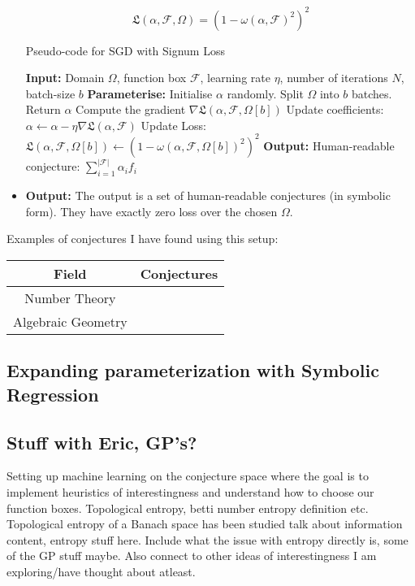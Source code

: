 \begin{itemize}
\begin{definition}
\begin{equation*}
                \mathfrak{L}(\alpha,\mathcal{F}, \Omega) = (1 - \omega(\alpha, \mathcal{F})^2)^2
            \end{equation*}
        \end{definition}
        \begin{algorithm}
        \caption{Pseudo-code for SGD with Signum Loss}\label{alg:SGD}
        \begin{algorithmic}
        \State \textbf{Input:} Domain $\Omega$, function box $\mathcal{F}$, learning rate $\eta$, number of iterations $N$, batch-size $b$
        \State \textbf{Parameterise:} Initialise $\alpha$ randomly. Split $\Omega$ into $b$ batches.
                    \State Return $\alpha$
                \EndIf
                \State Compute the gradient $\nabla\mathfrak{L}(\alpha, \mathcal{F}, \Omega[b])$ 
                \State Update coefficients: $\alpha \gets \alpha - \eta \nabla\mathfrak{L}(\alpha, \mathcal{F})$
                \State Update Loss: $\mathfrak{L}(\alpha, \mathcal{F}, \Omega[b]) \gets (1 - \omega(\alpha, \mathcal{F}, \Omega[b])^2)^2$
            \EndFor
        \EndFor
        \State \textbf{Output:} Human-readable conjecture: $\sum_{i = 1}^{|\mathcal{F}|}\alpha_i f_i$
        \end{algorithmic}
        \end{algorithm}   
    \item 
        \textbf{Output:} The output is a set of human-readable conjectures (in symbolic form). They have exactly zero loss over the chosen $\Omega$.
\end{itemize}

Examples of conjectures I have found using this setup:

\begin{tabular}{|c|c|}
    \hline
    \textbf{Field} & \textbf{Conjectures} \\
    \hline
    Number Theory & \\
    \hline
    Algebraic Geometry & \\
    \hline
\end{tabular}

\subsection{Expanding parameterization with Symbolic Regression}
\subsection{Stuff with Eric, GP's?}
Setting up machine learning on the conjecture space where the goal is to implement heuristics of interestingness and understand how to choose our function boxes.
Topological entropy, betti number entropy definition etc. Topological entropy of a Banach space has been studied \cite{bobokTopologicalEntropyBanach2011}
talk about information content, entropy stuff here. Include what the issue with entropy directly is, some of the GP stuff maybe. Also connect to other ideas of interestingness I am exploring/have thought about atleast.

